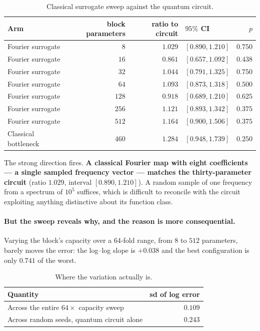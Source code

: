 \documentclass[11pt,onecolumn]{article}
\begin{document}
\begin{table}[htb]\centering\small
\caption{Classical surrogate sweep against the quantum circuit.}
\label{tab:surrogate}
\begin{tabular}{lrrlr}
\toprule
Arm & block parameters & ratio to circuit & $95\%$ CI & $p$ \\
\midrule
Fourier surrogate & $8$   & $\mathbf{1.029}$ & $[0.890, 1.210]$ & $0.750$ \\
Fourier surrogate & $16$  & $0.861$ & $[0.657, 1.092]$ & $0.438$ \\
Fourier surrogate & $32$  & $1.044$ & $[0.791, 1.325]$ & $0.750$ \\
Fourier surrogate & $64$  & $1.093$ & $[0.873, 1.318]$ & $0.500$ \\
Fourier surrogate & $128$ & $0.918$ & $[0.689, 1.210]$ & $0.625$ \\
Fourier surrogate & $256$ & $1.121$ & $[0.893, 1.342]$ & $0.375$ \\
Fourier surrogate & $512$ & $1.164$ & $[0.900, 1.506]$ & $0.375$ \\
Classical bottleneck & $460$ & $1.284$ & $[0.948, 1.739]$ & $0.250$ \\
\bottomrule
\end{tabular}
\end{table}

The strong direction fires. \textbf{A classical Fourier map with eight
coefficients --- a single sampled frequency vector --- matches the
thirty-parameter circuit} (ratio $1.029$, interval $[0.890, 1.210]$). A
random sample of one frequency from a spectrum of $10^5$ suffices, which
is difficult to reconcile with the circuit exploiting anything
distinctive about its function class.

\paragraph{But the sweep reveals why, and the reason is more
consequential.}
Varying the block's capacity over a $64$-fold range, from $8$ to $512$
parameters, barely moves the error: the log--log slope is $+0.038$ and
the best configuration is only $0.741$ of the worst.

\begin{table}[htb]\centering\small
\caption{Where the variation actually is.}
\begin{tabular}{lr}
\toprule
Quantity & sd of log error \\
\midrule
Across the entire $64\times$ capacity sweep & $\mathbf{0.109}$ \\
Across random seeds, quantum circuit alone  & $\mathbf{0.243}$ \\
\bottomrule
\end{tabular}
\end{table}
\end{document}
